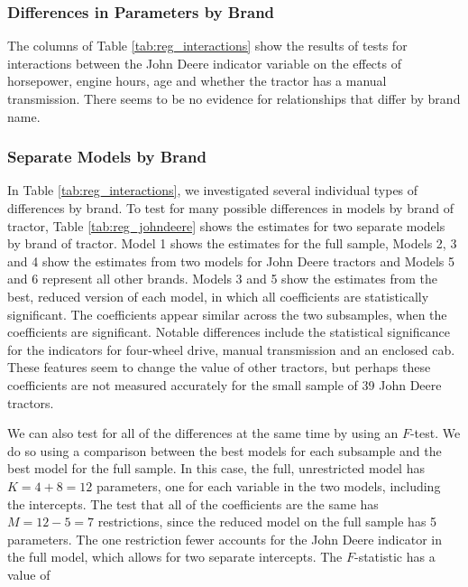 \documentclass[11pt]{paper}
\begin{document}
\subsubsection{Differences in Parameters by Brand}

The columns of Table \ref{tab:reg_interactions}
show the results of tests for interactions
between the John Deere indicator variable
on the effects of horsepower, engine hours, age
and whether the tractor has a manual transmission. 
There seems to be no evidence for relationships that differ by
brand name. 




\clearpage
\pagebreak
\subsubsection{Separate Models by Brand}

In Table \ref{tab:reg_interactions}, 
we investigated several 
individual types of differences by brand. 
To test for many possible differences in 
models by brand of tractor, 
Table \ref{tab:reg_johndeere}
shows the estimates for two separate models
by brand of tractor.
%
Model 1 shows the estimates for 
the full sample,
Models 2, 3 and 4 show the estimates from two models for 
John Deere tractors
and Models 5 and 6 
represent all other brands. 
% 
Models 3 and 5 show the estimates from 
the best, reduced version of each model, 
in which all coefficients are statistically significant. 
% 
The coefficients appear similar across the two subsamples, 
when the coefficients are significant.
Notable differences include the statistical significance for 
the indicators for four-wheel drive, 
manual transmission and an enclosed cab. 
These features seem to change the value of 
other tractors, but perhaps these coefficients are not measured 
accurately for the small sample of 39 
John Deere tractors. 



We can also test for all of the differences at the same time
by using an $F$-test. 
We do so using a comparison between the best models
for each subsample and the best model for the full sample.
In this case, the full, unrestricted model has 
$K = 4 + 8 = 12$
parameters, 
one for each variable in the two models, including the intercepts. 
The test that all of the coefficients are the same has 
$M = 12 - 5 = 7$
restrictions, 
since the reduced model on the full sample has 5 parameters. 
The one restriction fewer accounts for the John Deere indicator
in the full model, 
which allows for two separate intercepts. 
% 
The $F$-statistic has a value of 
\end{document}
